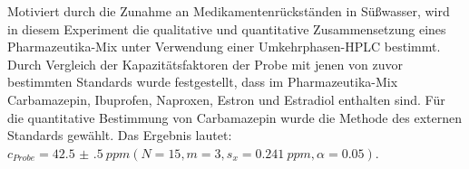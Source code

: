 Motiviert durch die Zunahme an Medikamentenrückständen in Süßwasser, wird in diesem Experiment die qualitative und quantitative Zusammensetzung eines Pharmazeutika-Mix unter Verwendung einer Umkehrphasen-HPLC bestimmt. Durch Vergleich der Kapazitätsfaktoren der Probe mit jenen von zuvor bestimmten Standards wurde festgestellt, dass im Pharmazeutika-Mix Carbamazepin, Ibuprofen, Naproxen, Estron und Estradiol enthalten sind. Für die quantitative Bestimmung von Carbamazepin wurde die Methode des externen Standards gewählt. Das Ergebnis lautet: $c_{Probe} = \SI[mode=text, multi-part-units = brackets, separate-uncertainty]{42.5(5)}{ppm} \left(N = 15, m = 3, s_x = \SI[mode=text]{0.241}{ppm}, \alpha = 0.05\right)$.
